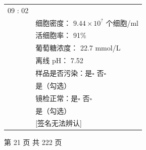 \documentclass[UTF8,10pt,a4paper,fontset=fandol]{ctexart}
\newcommand{\fieldvalue}[1]{#1}
\newcommand{\handwritten}[1]{#1}
\begin{document}
\begin{tabularx}{\textwidth}{|p{}|X|}
\fieldvalue{\handwritten{09 : 02}}\\
& 细胞密度：
\fieldvalue{\handwritten{$9.44\times10^{?}$}} 个细胞/ml\\
& 活细胞率：
\fieldvalue{\handwritten{91}}\%\\
& 葡萄糖浓度：
\fieldvalue{\handwritten{22.7}} mmol/L\\
& 离线 pH：
\fieldvalue{\handwritten{7.52}}\\
& 样品是否污染：是$\square$ 否$\square$\\[-2pt]
&
\fieldvalue{\handwritten{是（勾选）}}\\
& 镜检正常：是$\square$ 否$\square$\\[-2pt]
&
\fieldvalue{\handwritten{是（勾选）}}\\
&
\handwritten{[签名无法辨认]}\\
\hline
\end{tabularx}

\begin{center}
第 21 页 共 222 页
\end{center}

\newpage
\end{document}
